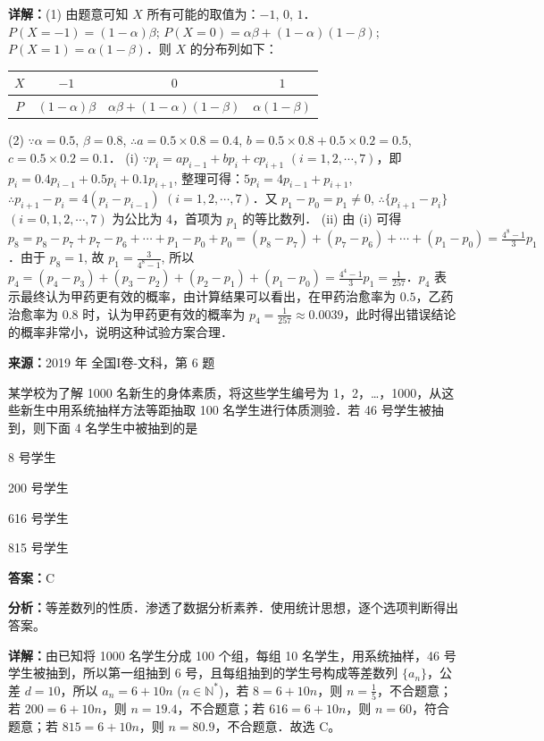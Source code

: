 \begin{question}[points=12]
\begin{solution}
\textbf{详解：}(1) 由题意可知 $X$ 所有可能的取值为：$-1$, $0$, $1$．$P(X = -1) = (1 - \alpha)\beta$; $P(X = 0) = \alpha\beta + (1 - \alpha)(1 - \beta)$; $P(X = 1) = \alpha(1 - \beta)$．则 $X$ 的分布列如下：
\begin{center}
\begin{tabular}{c|c|c|c}
$X$ & $-1$ & $0$ & $1$ \\ \hline
$P$ & $(1-\alpha)\beta$ & $\alpha\beta + (1-\alpha)(1-\beta)$ & $\alpha(1-\beta)$
\end{tabular}
\end{center}
(2) $\because \alpha = 0.5$, $\beta = 0.8$, $\therefore a = 0.5 \times 0.8 = 0.4$, $b = 0.5 \times 0.8 + 0.5 \times 0.2 = 0.5$, $c = 0.5 \times 0.2 = 0.1$．
(i) $\because p_i = a p_{i-1} + b p_i + c p_{i+1}$ $(i = 1,2,\cdots,7)$，即 $p_i = 0.4p_{i-1} + 0.5p_i + 0.1p_{i+1}$, 整理可得：$5p_i = 4p_{i-1} + p_{i+1}$, $\therefore p_{i+1} - p_i = 4(p_i - p_{i-1})$ $(i = 1,2,\cdots,7)$．又 $p_1 - p_0 = p_1 \neq 0$, $\therefore \{p_{i+1} - p_i\}$ $(i = 0,1,2,\cdots,7)$ 为公比为 $4$，首项为 $p_1$ 的等比数列．
(ii) 由 (i) 可得 $p_8 = p_8 - p_7 + p_7 - p_6 + \cdots + p_1 - p_0 + p_0 = (p_8 - p_7) + (p_7 - p_6) + \cdots + (p_1 - p_0) = \frac{4^8 - 1}{3}p_1$．由于 $p_8 = 1$, 故 $p_1 = \frac{3}{4^8 - 1}$, 所以 $p_4 = (p_4 - p_3) + (p_3 - p_2) + (p_2 - p_1) + (p_1 - p_0) = \frac{4^4 - 1}{3}p_1 = \frac{1}{257}$．$p_4$ 表示最终认为甲药更有效的概率，由计算结果可以看出，在甲药治愈率为 $0.5$，乙药治愈率为 $0.8$ 时，认为甲药更有效的概率为 $p_4 = \frac{1}{257} \approx 0.0039$，此时得出错误结论的概率非常小，说明这种试验方案合理．
\end{solution}
\end{question}

\begin{question}[points=5]
\textbf{来源：}2019 年 全国I卷-文科，第 6 题\par
某学校为了解 1000 名新生的身体素质，将这些学生编号为 1，2，…，1000，从这些新生中用系统抽样方法等距抽取 100 名学生进行体质测验．若 46 号学生被抽到，则下面 4 名学生中被抽到的是
\begin{choices}
  \item 8 号学生
  \item 200 号学生
  \item 616 号学生
  \item 815 号学生
\end{choices}
\begin{solution}
\textbf{答案：}C

\textbf{分析：}等差数列的性质．渗透了数据分析素养．使用统计思想，逐个选项判断得出答案。

\textbf{详解：}由已知将 1000 名学生分成 100 个组，每组 10 名学生，用系统抽样，46 号学生被抽到，所以第一组抽到 6 号，且每组抽到的学生号构成等差数列 $\{a_n\}$，公差 $d=10$，所以 $a_n = 6+10n$ ($n \in \mathbb{N}^*$)，若 $8=6+10n$，则 $n=\frac{1}{5}$，不合题意；若 $200=6+10n$，则 $n=19.4$，不合题意；若 $616=6+10n$，则 $n=60$，符合题意；若 $815=6+10n$，则 $n=80.9$，不合题意．故选 C。
\end{solution}
\end{question}

